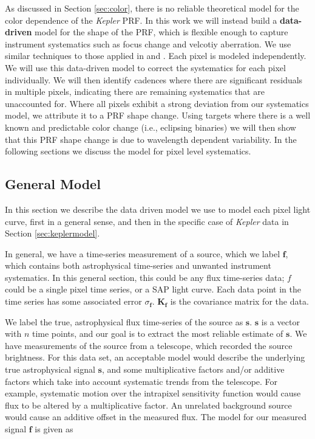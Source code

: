 \documentclass[iop]{emulateapj}
\newcommand{\kepler}{\emph{Kepler}\xspace}
\newcommand{\sa}{(\mathbf{S} \cdot \mathbf{X})}
\begin{document}

As discussed in Section \ref{sec:color}, there is no reliable theoretical model for the color dependence of the \kepler PRF. In this work we will instead build a \textbf{data-driven} model for the shape of the PRF, which is flexible enough to capture instrument systematics such as focus change and velcotiy aberration. We use similar techniques to those applied in \cite{Luger2016} and \cite{Vanderburg2014}. Each pixel is modeled independently. We will use this data-driven model to correct the systematics for each pixel individually. We will then identify cadences where there are significant residuals in multiple pixels, indicating there are remaining systematics that are unaccounted for. Where all pixels exhibit a strong deviation from our systematics model, we attribute it to a PRF shape change. Using targets where there is a well known and predictable color change (i.e., eclipsing binaries) we will then show that this PRF shape change is due to wavelength dependent variability. In the following sections we discuss the model for pixel level systematics.


\subsection{General Model}
In this section we describe the data driven model we use to model each pixel light curve, first in a general sense, and then in the specific case of \kepler data in Section \ref{sec:keplermodel}.

In general, we have a time-series measurement of a source, which we label $\mathbf{f}$, which contains both astrophysical time-series and unwanted instrument systematics. In this general section, this could be any flux time-series data; $f$ could be a single pixel time series, or a SAP light curve. Each data point in the time series has some associated error $\sigma_\mathbf{f}$. $\mathbf{K_\mathbf{f}}$ is the covariance matrix for the data.

We label the true, astrophysical flux time-series of the source as $\mathbf{s}$. $\mathbf{s} $ is a vector with $n$ time points, and our goal is to extract the most reliable estimate of $\mathbf{s}$. We have measurements of the source from a telescope, which recorded the source brightness. For this data set, an acceptable model would describe the underlying true astrophysical signal $\mathbf{s}$, and some multiplicative factors and/or additive factors which take into account systematic trends from the telescope. For example, systematic motion over the intrapixel sensitivity function would cause flux to be altered by a multiplicative factor. An unrelated background source would cause an additive offset in the measured flux. The model for our measured signal $\mathbf{f}$ is given as
\end{document}

